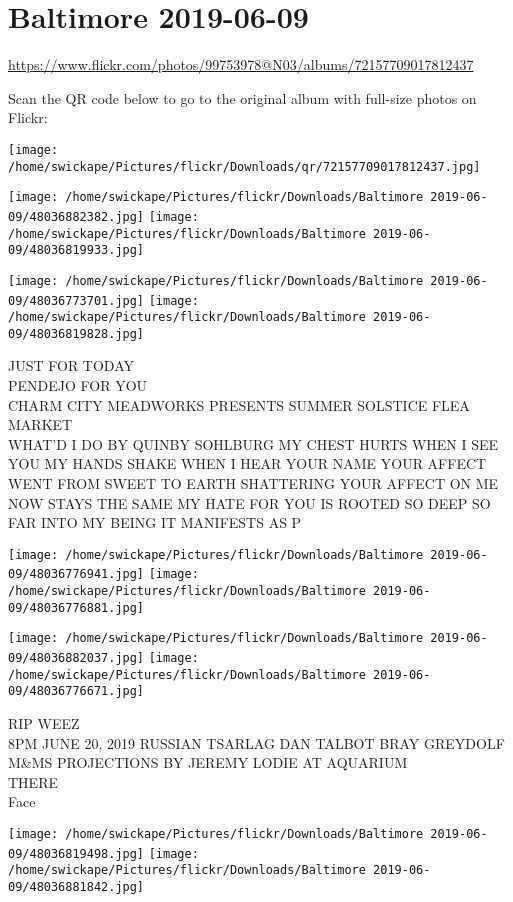 \documentclass[10pt,letterpaper]{article}
\title{}
\author{}
\date{}
\begin{document}
\section*{Baltimore 2019-06-09}

\url{https://www.flickr.com/photos/99753978@N03/albums/72157709017812437}

Scan the QR code below to go to the original album with full-size photos on Flickr:

\texttt{[image: /home/swickape/Pictures/flickr/Downloads/qr/72157709017812437.jpg]}
\pagebreak

\texttt{[image: /home/swickape/Pictures/flickr/Downloads/Baltimore 2019-06-09/48036882382.jpg]}
\texttt{[image: /home/swickape/Pictures/flickr/Downloads/Baltimore 2019-06-09/48036819933.jpg]}

\texttt{[image: /home/swickape/Pictures/flickr/Downloads/Baltimore 2019-06-09/48036773701.jpg]}
\texttt{[image: /home/swickape/Pictures/flickr/Downloads/Baltimore 2019-06-09/48036819828.jpg]}

JUST FOR TODAY\\
PENDEJO FOR YOU\\
CHARM CITY MEADWORKS PRESENTS SUMMER SOLSTICE FLEA MARKET\\
WHAT'D I DO BY QUINBY SOHLBURG MY CHEST HURTS WHEN I SEE YOU MY HANDS SHAKE WHEN I HEAR YOUR NAME YOUR AFFECT WENT FROM SWEET TO EARTH SHATTERING YOUR AFFECT ON ME NOW STAYS THE SAME MY HATE FOR YOU IS ROOTED SO DEEP SO FAR INTO MY BEING IT MANIFESTS AS P
\pagebreak

\texttt{[image: /home/swickape/Pictures/flickr/Downloads/Baltimore 2019-06-09/48036776941.jpg]}
\texttt{[image: /home/swickape/Pictures/flickr/Downloads/Baltimore 2019-06-09/48036776881.jpg]}

\texttt{[image: /home/swickape/Pictures/flickr/Downloads/Baltimore 2019-06-09/48036882037.jpg]}
\texttt{[image: /home/swickape/Pictures/flickr/Downloads/Baltimore 2019-06-09/48036776671.jpg]}

RIP WEEZ\\
8PM JUNE 20, 2019 RUSSIAN TSARLAG DAN TALBOT BRAY GREYDOLF M\&MS PROJECTIONS BY JEREMY LODIE AT AQUARIUM\\
THERE\\
Face
\pagebreak

\texttt{[image: /home/swickape/Pictures/flickr/Downloads/Baltimore 2019-06-09/48036819498.jpg]}
\texttt{[image: /home/swickape/Pictures/flickr/Downloads/Baltimore 2019-06-09/48036881842.jpg]}
\end{document}
